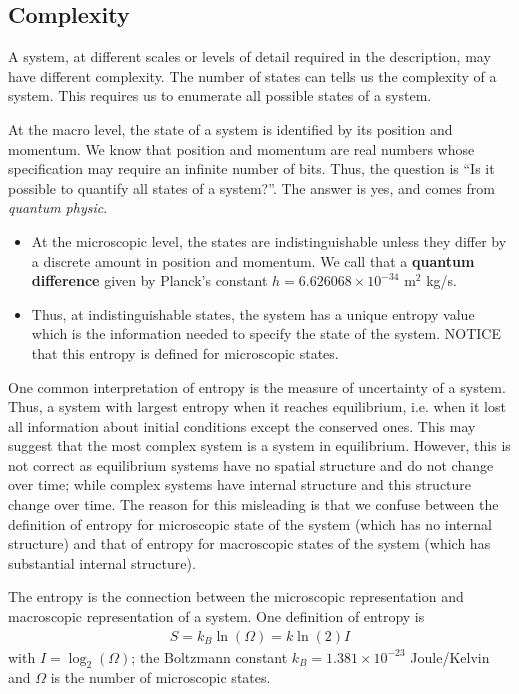 \subsection{Complexity}
\label{sec:complexity}

A system, at different scales or levels of detail required in the
description, may have different complexity. The number of states can
tells us the complexity of a system. This requires us to enumerate all
possible states of a system.

At the macro level, the state of a system is identified by its
position and momentum. We know that position and momentum are real
numbers whose specification may require an infinite number of
bits. Thus, the question is ``Is it possible to quantify all states of
a system?''.  The answer is yes, and comes from {\it quantum physic}.
\begin{itemize}
\item At the microscopic level, the states are indistinguishable unless they
differ by a discrete amount in position and momentum. We call that a
{\bf quantum difference} given by Planck's constant $h=6.626068 \times
10^{-34}$ m$^2$ kg/s.
\item Thus, at indistinguishable states, the system has a unique
  entropy value which is the information needed to specify the state
  of the system. NOTICE that this entropy is defined for microscopic
  states. 
\end{itemize}

One common interpretation of entropy is the measure of uncertainty of
a system. Thus, a system with largest entropy when it reaches
equilibrium, i.e. when it lost all information about initial
conditions except the conserved ones. This may suggest that the most
complex system is a system in equilibrium. However, this is not
correct as equilibrium systems have no spatial structure and do not
change over time; while complex systems have internal structure and
this structure change over time. The reason for this misleading is
that we confuse between the definition of entropy for microscopic
state of the system (which has no internal structure) and that of
entropy for macroscopic states of the system (which has substantial
internal structure).

The entropy is the connection between the microscopic representation
and macroscopic representation of a system. One definition of entropy
is
\begin{eqnarray}
\label{eq:entropy}
  S = k_B \ln(\Omega) = k \ln(2) I
\end{eqnarray}
with $I = \log_2(\Omega)$; the Boltzmann constant $k_B=1.381\times
10^{-23}$ Joule/Kelvin and $\Omega$ is the number of microscopic
states. 


